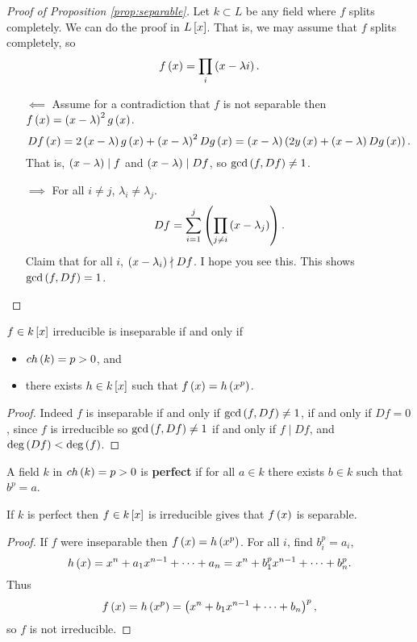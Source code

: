 \begin{proof}[Proof of Proposition \ref{prop:separable}]
Let $ k \subset L $ be any field where $ f $ splits completely. We can do the proof in $ L\sb{x} $. That is, we may assume that $ f $ splits completely, so
$$ f\rb{x} = \prod_i \rb{x - \lambda i}. $$
\begin{itemize}
\item[$ \impliedby $] Assume for a contradiction that $ f $ is not separable then $ f\rb{x} = \rb{x - \lambda}^2g\rb{x} $.
$$ Df\rb{x} = 2\rb{x - \lambda}g\rb{x} + \rb{x - \lambda}^2Dg\rb{x} = \rb{x - \lambda}\rb{2y\rb{x} + \rb{x - \lambda}Dg\rb{x}}. $$
That is, $ \rb{x - \lambda} \mid f $ and $ \rb{x - \lambda} \mid Df $, so $ \gcd\rb{f, Df} \ne 1 $.
\item[$ \implies $] For all $ i \ne j $, $ \lambda_i \ne \lambda_j $.
$$ Df = \sum_{i = 1}^j \rb{\prod_{j \ne i} \rb{x - \lambda_j}}. $$
Claim that for all $ i $, $ \rb{x - \lambda_i} \nmid Df $. I hope you see this. This shows $ \gcd\rb{f, Df} = 1 $.
\end{itemize}
\end{proof}

\begin{theorem}
$ f \in k\sb{x} $ irreducible is inseparable if and only if
\begin{itemize}
\item $ ch\rb{k} = p > 0 $, and
\item there exists $ h \in k\sb{x} $ such that $ f\rb{x} = h\rb{x^p} $.
\end{itemize}
\end{theorem}

\begin{proof}
Indeed $ f $ is inseparable if and only if $ \gcd\rb{f, Df} \ne 1 $, if and only if $ Df = 0 $, since $ f $ is irreducible so $ \gcd\rb{f, Df} \ne 1 $ if and only if $ f \mid Df $, and $ \deg\rb{Df} < \deg\rb{f} $.
\end{proof}

\begin{definition}
A field $ k $ in $ ch\rb{k} = p > 0 $ is \textbf{perfect} if for all $ a \in k $ there exists $ b \in k $ such that $ b^p = a $.
\end{definition}

\begin{proposition}
If $ k $ is perfect then $ f \in k\sb{x} $ is irreducible gives that $ f\rb{x} $ is separable.
\end{proposition}

\begin{proof}
If $ f $ were inseparable then $ f\rb{x} = h\rb{x^p} $. For all $ i $, find $ b_i^p = a_i $,
$$ h\rb{x} = x^n + a_1x^{n - 1} + \dots + a_n = x^n + b_1^px^{n - 1} + \dots + b_n^p. $$
Thus
$$ f\rb{x} = h\rb{x^p} = \rb{x^n + b_1x^{n - 1} + \dots + b_n}^p, $$
so $ f $ is not irreducible.
\end{proof}

